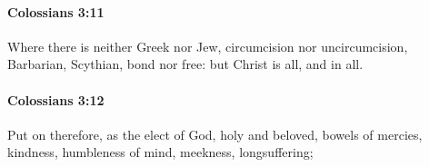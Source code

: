 		\paragraph{Colossians 3:11} %
			\label{COLOSSIANS-3-11}

			Where there is neither Greek nor Jew, circumcision nor uncircumcision, Barbarian, Scythian, bond nor free: but Christ is all, and in all.

			\begin{framed}
			\scriptsize
				\begin{compactdesc}
					\item[SBLG] 
				\end{compactdesc}
			\end{framed}

		\paragraph{Colossians 3:12} %
			\label{COLOSSIANS-3-12}

			Put on therefore, as the elect of God, holy and beloved, bowels of mercies, kindness, humbleness of mind, meekness, longsuffering;

